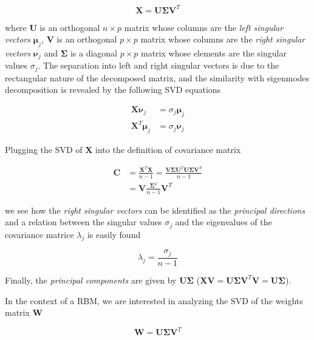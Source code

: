 \documentclass{revtex4-1}
\begin{document}
\begin{equation}
\mathbf{X} = \mathbf{U \Sigma} \mathbf{V}^T
\end{equation}

where \(\mathbf{U}\) is an orthogonal \(n \times p\)  matrix whose columns are the \textit{left singular vectors} \(\mathbf{\mu}_j \), \(\mathbf{V}\) is an orthogonal \(p \times p\) matrix whose columns are the \textit{right singular vectors} \( \mathbf{\nu}_j \) and \( \mathbf{\Sigma} \) is a diagonal \(p \times p\) matrix whose elements are the singular values \(\sigma_j\). The separation into left and right singular vectors is due to the rectangular nature of the decomposed matrix, and the similarity with eigenmodes decomposition is revealed by the following SVD equations

\begin{align}
\mathbf{X} \mathbf{\nu}_j & = \sigma_j \mathbf{\mu}_j \\
\mathbf{X}^T \mathbf{\mu}_j & = \sigma_j \mathbf{\nu}_j
\end{align}

Plugging the SVD of \(\mathbf{X}\) into the definition of covariance matrix

\begin{align}
\mathbf{C} & = \frac{\mathbf{X}^T \mathbf{X}}{n-1} = \frac{\mathbf{V \Sigma U}^T \mathbf{U \Sigma V}^T}{n-1}  \\ \nonumber
& = \mathbf{V} \frac{\mathbf{\Sigma}^2}{n-1} \mathbf{V}^T \nonumber 
\end{align}

we see how the \textit{right singular vectors} can be identified as the \textit{principal directions} and a relation between the singular values \(\sigma_j\) and the eigenvalues of the covariance matrice \(\lambda_j\) is easily found

\begin{equation}
\lambda_j = \frac{\sigma_j}{n-1}
\label{eq:ls_map}
\end{equation}

Finally, the \textit{principal components} are given by \(\mathbf{U \Sigma}\) (\(\mathbf{XV} = \mathbf{U \Sigma V}^T \mathbf{V} = \mathbf{U \Sigma}\)).

In the context of a RBM, we are interested in analyzing the SVD of the weights matrix \(\mathbf{W}\)

\begin{equation}
\mathbf{W} = \mathbf{U \Sigma V}^T
\end{equation}
\end{document}

